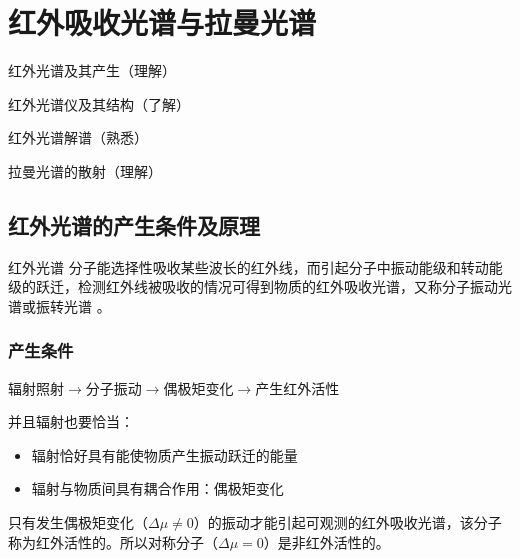 \chapter{红外吸收光谱与拉曼光谱}
\begin{introduction}
	\item 红外光谱及其产生（理解）
	\item 红外光谱仪及其结构（了解）
	\item 红外光谱解谱（熟悉）
	\item 拉曼光谱的散射（理解）
\end{introduction}
\section{红外光谱的产生条件及原理}
\begin{definition*}{红外光谱}
	分子能选择性吸收某些波长的红外线，而引起分子中振动能级和转动能级的跃迁，检测红外线被吸收的情况可得到物质的红外吸收光谱，又称分子振动光谱或振转光谱 。
\end{definition*}
\subsection{产生条件}
辐射照射$\to$分子振动$\to$偶极矩变化$\to$产生红外活性

并且辐射也要恰当：
\begin{itemize}
	\item 辐射恰好具有能使物质产生振动跃迁的能量
	\item 辐射与物质间具有耦合作用：偶极矩变化
\end{itemize}
\begin{note}
	只有发生偶极矩变化（$\Delta \mu \neq 0$）的振动才能引起可观测的红外吸收光谱，该分子称为红外活性的。所以对称分子（$\Delta \mu=0$）是非红外活性的。
\end{note}
